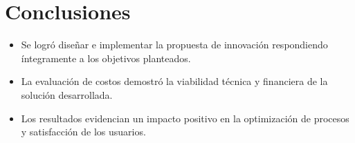\section*{Conclusiones}
\begin{itemize}
    \item Se logró diseñar e implementar la propuesta de innovación respondiendo íntegramente a los objetivos planteados.
    \item La evaluación de costos demostró la viabilidad técnica y financiera de la solución desarrollada.
    \item Los resultados evidencian un impacto positivo en la optimización de procesos y satisfacción de los usuarios.
\end{itemize}

